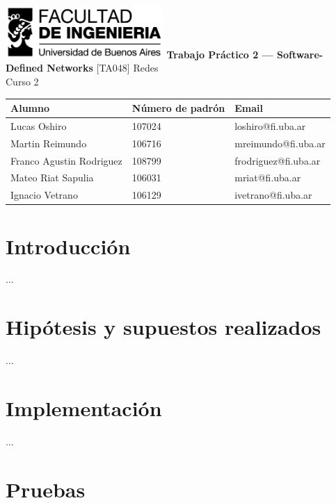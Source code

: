 \documentclass[titlepage,a4paper]{article}
\begin{document}
\begin{titlepage} %
    \hfill\includegraphics[width=6cm]{img/logofiuba.jpg}
    \centering
    \vfill
    \Huge \textbf{Trabajo Práctico 2 —  Software-Defined Networks}
    \vskip2cm
    \Large [TA048] Redes \\
    Curso 2 \\ 
    \vfill
    \begin{tabular}{ | l | l | l |}
      \hline
      Alumno & Número de padrón & Email \\ \hline
      Lucas Oshiro & 107024 & loshiro@fi.uba.ar \\ \hline
      Martin Reimundo & 106716 & mreimundo@fi.uba.ar \\ \hline
      Franco Agustin Rodriguez & 108799 & frodriguez@fi.uba.ar \\ \hline
      Mateo Riat Sapulia & 106031 & mriat@fi.uba.ar \\ \hline
      Ignacio Vetrano & 106129 & ivetrano@fi.uba.ar \\ \hline
    \end{tabular}
    \vfill
    \vfill
\end{titlepage}

\tableofcontents %
\newpage

\section{Introducción}\label{sec:intro}

    ...

\section{Hipótesis y supuestos realizados}\label{sec:supuestos}

...

\section{Implementación}\label{sec:implementacion}

...

\section{Pruebas}\label{sec:pruebas}
\end{document}
